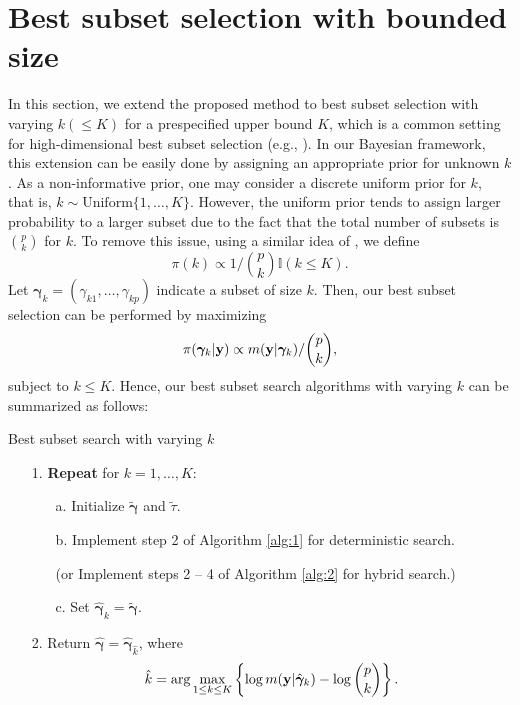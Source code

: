 \documentclass[12pt]{article}
\def\uy{{\bf y}}
\def\bg{{\boldsymbol \gamma}}
\begin{document}
\section{Best subset selection with bounded size}\label{sec:3}
In this section, we extend the proposed method to best subset selection with varying $k (\leq K)$ for a prespecified upper bound $K$, which is a common setting for high-dimensional best subset selection (e.g., \citealt{bertsimas2016best, liang2013bayesian}). In our Bayesian framework, this extension can be easily done by assigning an appropriate prior for unknown $k$. As a non-informative prior, one may consider a discrete uniform prior for $k$, that is, $k \sim \text{Uniform}\{1,\ldots,K\}$. However, the uniform prior tends to assign larger probability to a larger subset due to the fact that the total number of subsets is $\binom{p}{k}$ for $k$. To remove this issue, using  a similar idea of \citet{chen2008extended}, we define
$$\pi(k)\propto 1/\binom{p}{k} \mathbb{I}(k\leq K).$$
Let $\bg_{k}=(\gamma_{k1},\ldots,\gamma_{kp})$ indicate a subset of size $k$. Then, our best subset selection can be performed by maximizing
\begin{eqnarray*}
 \pi(\bg_k|\uy)\propto  m(\uy|\bg_k)/\binom{p}{k},
\end{eqnarray*}
subject to $k\leq K$. Hence, our best subset search algorithms with varying $k$ can be summarized as follows:
\begin{algorithm}[ht]
 \caption{Best subset search with varying $k$}\label{alg:3}
 \begin{itemize}
  \item[1.] \textbf{Repeat} for $k=1,\ldots,K$:
        \begin{itemize}
         \item[a.] Initialize $\tilde{\bg}$ and $\tilde{\tau}$.
         \item[b.] Implement step 2 of Algorithm \ref{alg:1} for deterministic search.
         \item[] (or Implement steps 2 -- 4 of Algorithm \ref{alg:2} for hybrid search.)
         \item[c.] Set $\hat{\bg}_k=\tilde{\bg}$.
        \end{itemize}
  \item[2.] Return $\hat{\bg}=\hat{\bg}_{\hat{k}}$, where \begin{eqnarray}\label{eq:post}  \hat{k}=\arg\max_{1\leq k\leq K} \left\{\log m(\uy|\hat{\bg}_k)-\log \binom{p}{k}\right\}.
        \end{eqnarray}
 \end{itemize}
\end{algorithm}
\end{document}
